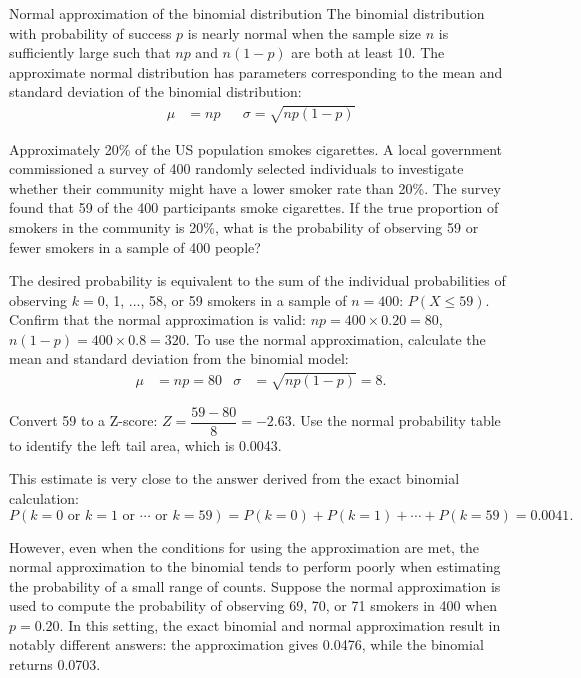 \begin{onebox}{Normal approximation of the binomial distribution}
The binomial distribution with probability of success $p$ is nearly normal when the sample size $n$ is sufficiently large such that $np$ and $n(1-p)$ are both at least 10. The approximate normal distribution has parameters corresponding to the mean and standard deviation of the binomial distribution:\vspace{-1.5mm}
\begin{align*}
\mu &= np
&&\sigma= \sqrt{np(1-p)}
\end{align*}
\end{onebox}

\begin{examplewrap}
\begin{nexample}{Approximately 20\% of the US population smokes cigarettes. A local government commissioned a survey of 400 randomly selected individuals to investigate whether their community might have a lower smoker rate than 20\%. The survey found that 59 of the 400 participants smoke cigarettes. If the true proportion of smokers in the community is 20\%, what is the probability of observing 59 or fewer smokers in a sample of 400 people?}\label{approxBinomialForN400P20SmokerExample}
		
The desired probability is equivalent to the sum of the individual probabilities of observing $k=0$, 1, ..., 58, or 59 smokers in a sample of $n=400$: $P(X \leq 59)$. Confirm that the normal approximation is valid: $np=400\times 0.20=80$, $n(1-p)=400\times 0.8=320$. To use the normal approximation, calculate the mean and standard deviation from the binomial model:
\begin{align*}
		\mu &= np = 80
		&\sigma &= \sqrt{np(1-p)} = 8.
\end{align*}
		
Convert 59 to a Z-score: $Z = \dfrac{59-80}{8} = -2.63$. Use the normal probability table to identify the left tail area, which is 0.0043. 
		
This estimate is very close to the answer derived from the exact binomial calculation:
\[P(k=0\text{ or }k=1\text{ or }\cdots\text{ or } k=59) = P(k=0) + P(k=1) + \cdots + P(k=59) = 0.0041. \]
\end{nexample}
\end{examplewrap}
	
However, even when the conditions for using the approximation are met, the normal approximation to the binomial tends to perform poorly when estimating the probability of a small range of counts. Suppose the normal approximation is used to compute the probability of observing 69, 70, or 71 smokers in 400 when $p=0.20$. In this setting, the exact binomial and normal approximation result in notably different answers: the approximation gives 0.0476, while the binomial returns 0.0703.
	
